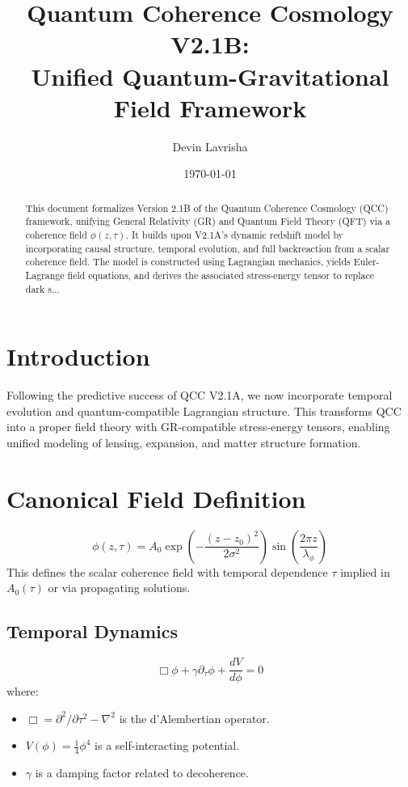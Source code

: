 \documentclass[11pt]{article}
\title{Quantum Coherence Cosmology V2.1B: \\
Unified Quantum-Gravitational Field Framework}
\author[1]{Devin Lavrisha}
\affil[1]{Quantum Coherence Project}
\date{\today}
\begin{document}
\maketitle

\begin{abstract}
This document formalizes Version 2.1B of the Quantum Coherence Cosmology (QCC) framework, unifying General Relativity (GR) and Quantum Field Theory (QFT) via a coherence field \( \phi(z, \tau) \). It builds upon V2.1A’s dynamic redshift model by incorporating causal structure, temporal evolution, and full backreaction from a scalar coherence field. The model is constructed using Lagrangian mechanics, yields Euler-Lagrange field equations, and derives the associated stress-energy tensor to replace dark s...
\end{abstract}

\section{Introduction}
Following the predictive success of QCC V2.1A, we now incorporate temporal evolution and quantum-compatible Lagrangian structure. This transforms QCC into a proper field theory with GR-compatible stress-energy tensors, enabling unified modeling of lensing, expansion, and matter structure formation.

\section{Canonical Field Definition}
\begin{equation}
\phi(z, \tau) = A_0 \exp\left(-\frac{(z - z_0)^2}{2 \sigma^2}\right) \sin\left(\frac{2\pi z}{\lambda_\phi}\right)
\end{equation}
This defines the scalar coherence field with temporal dependence \( \tau \) implied in \( A_0(\tau) \) or via propagating solutions.

\subsection{Temporal Dynamics}
\begin{equation}
\Box \phi + \gamma \partial_\tau \phi + \frac{dV}{d\phi} = 0
\end{equation}
where:
\begin{itemize}
  \item \( \Box = \partial^2/\partial \tau^2 - \nabla^2 \) is the d'Alembertian operator.
  \item \( V(\phi) = \frac{1}{4} \phi^4 \) is a self-interacting potential.
  \item \( \gamma \) is a damping factor related to decoherence.
\end{itemize}
\end{document}
